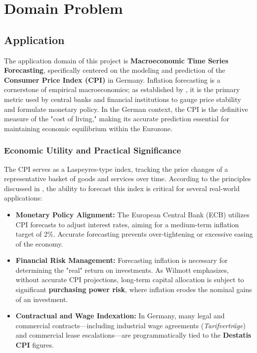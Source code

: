 %
%
%

\chapter{Domain Problem}
\label{ch:domain-problem}

\section{Application}

The application domain of this project is \textbf{Macroeconomic Time Series Forecasting}, specifically centered on the modeling and prediction of the \textbf{Consumer Price Index (CPI)} in Germany. Inflation forecasting is a cornerstone of empirical macroeconomics; as established by \cite{StockWatson1999}, it is the primary metric used by central banks and financial institutions to gauge price stability and formulate monetary policy. In the German context, the CPI is the definitive measure of the "cost of living," making its accurate prediction essential for maintaining economic equilibrium within the Eurozone.

\subsection{Economic Utility and Practical Significance}

The CPI serves as a Laspeyres-type index, tracking the price changes of a representative basket of goods and services over time. According to the principles discussed in \cite{Wilmott:2007}, the ability to forecast this index is critical for several real-world applications:

\begin{itemize}
	\item \textbf{Monetary Policy Alignment:} The European Central Bank (ECB) utilizes CPI forecasts to adjust interest rates, aiming for a medium-term inflation target of 2\%. Accurate forecasting prevents over-tightening or excessive easing of the economy.
	
	\item \textbf{Financial Risk Management:} Forecasting inflation is necessary for determining the "real" return on investments. As Wilmott emphasizes, without accurate CPI projections, long-term capital allocation is subject to significant \textbf{purchasing power risk}, where inflation erodes the nominal gains of an investment.
	
	\item \textbf{Contractual and Wage Indexation:} In Germany, many legal and commercial contracts—including industrial wage agreements (\textit{Tarifverträge}) and commercial lease escalations—are programmatically tied to the \textbf{Destatis CPI} figures.
\end{itemize}

